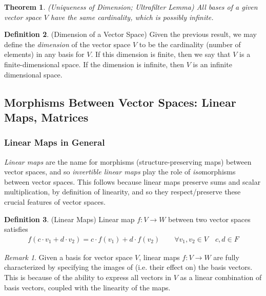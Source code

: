 \documentclass[12pt]{book}
\numberwithin{equation}{section} %
\theoremstyle{plain}
\newtheorem{thm}{Theorem}[section]
\theoremstyle{definition}
\newtheorem{defn}[thm]{Definition}
\theoremstyle{remark}
\newtheorem*{rmk}{Remark}
\newcommand{\ra}{\rightarrow}
\begin{document}
\begin{thm}\emph{(Uniqueness of Dimension; Ultrafilter Lemma)}
All bases of a given vector space $V$ have the same cardinality, which
is possibly infinite.
\end{thm}

\begin{defn}(Dimension of a Vector Space)
Given the previous result, we may define the \emph{dimension} of the
vector space $V$ to be the cardinality (number of elements) in any basis
for $V$.
If this dimension is finite, then we say that $V$ is a
finite-dimensional space.
If the dimension is infinite, then $V$ is an infinite dimensional space.
\end{defn}





\clearpage
\subsection{Morphisms Between Vector Spaces: Linear Maps, Matrices}
\label{sec:linearmaps}

\subsubsection{Linear Maps in General}


\emph{Linear maps} are the name for morphisms (structure-preserving
maps) between vector spaces, and so \emph{invertible linear maps} play
the role of \emph{iso}morphisms between vector spaces.
This follows because linear maps preserve sums and scalar
multiplication, by definition of linearity, and so they respect/preserve
these crucial features of vector spaces.


\begin{defn}(Linear Maps)
Linear map $f:V\ra W$ between two vector spaces satisfies
\begin{align*}
  f(c\cdot v_1+d\cdot v_2)
  =
  c\cdot f(v_1)
  +
  d\cdot f(v_2)
  \qquad
  \forall v_1,v_2\in V
  \quad
  c,d\in F
\end{align*}
\end{defn}
\begin{rmk}
Given a basis for vector space $V$, linear maps $f : V \ra W$ are fully
characterized by specifying the images of (i.e. their effect on) the
basis vectors.
This is because of the ability to express all vectors in $V$ as a linear
combination of basis vectors, coupled with the linearity of the maps.
\end{rmk}
\end{document}
